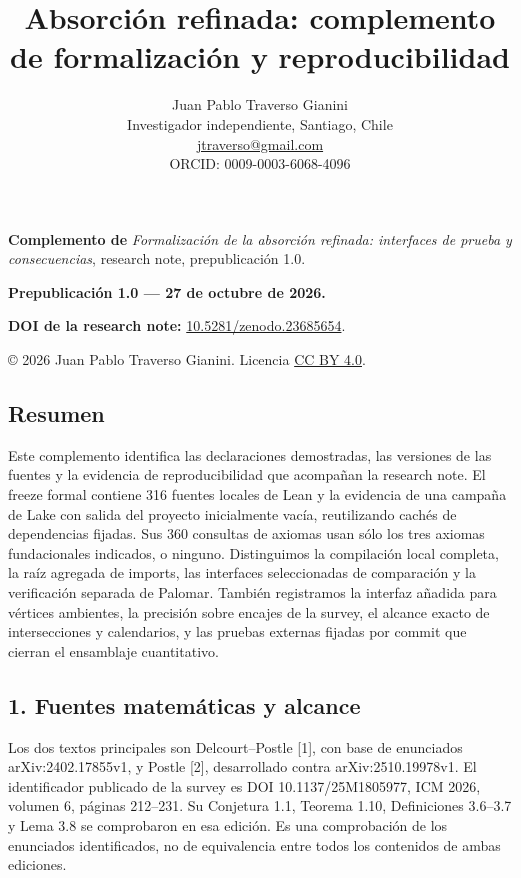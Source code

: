 \documentclass[spanish,11pt,a4paper]{article}
\title{Absorción refinada: complemento de formalización y reproducibilidad}
\author{Juan Pablo Traverso Gianini\\
\small Investigador independiente, Santiago, Chile\\
\small \href{mailto:jtraverso@gmail.com}{jtraverso@gmail.com}\\
\small ORCID: 0009-0003-6068-4096}
\date{}
\begin{document}
\raggedbottom
{}
\makeatletter
{}
\makeatother
\maketitle
\textbf{Complemento de} \emph{Formalización de la absorción refinada: interfaces de prueba y consecuencias}, research note, prepublicación 1.0.

\textbf{Prepublicación 1.0 --- 27 de octubre de 2026.}

\textbf{DOI de la research note:} \href{https://doi.org/10.5281/zenodo.23685654}{10.5281/zenodo.23685654}.

© 2026 Juan Pablo Traverso Gianini. Licencia \href{https://creativecommons.org/licenses/by/4.0/}{CC BY 4.0}.

\subsection{Resumen}\label{resumen}

Este complemento identifica las declaraciones demostradas, las versiones de las fuentes y la evidencia de reproducibilidad que acompañan la research note. El freeze formal contiene 316 fuentes locales de Lean y la evidencia de una campaña de Lake con salida del proyecto inicialmente vacía, reutilizando cachés de dependencias fijadas. Sus 360 consultas de axiomas usan sólo los tres axiomas fundacionales indicados, o ninguno. Distinguimos la compilación local completa, la raíz agregada de imports, las interfaces seleccionadas de comparación y la verificación separada de Palomar. También registramos la interfaz añadida para vértices ambientes, la precisión sobre encajes de la survey, el alcance exacto de intersecciones y calendarios, y las pruebas externas fijadas por commit que cierran el ensamblaje cuantitativo.

\subsection{1. Fuentes matemáticas y alcance}\label{fuentes-matemuxe1ticas-y-alcance}

Los dos textos principales son Delcourt--Postle {[}1{]}, con base de enunciados arXiv:2402.17855v1, y Postle {[}2{]}, desarrollado contra arXiv:2510.19978v1. El identificador publicado de la survey es DOI 10.1137/25M1805977, ICM 2026, volumen 6, páginas 212--231. Su Conjetura 1.1, Teorema 1.10, Definiciones 3.6--3.7 y Lema 3.8 se comprobaron en esa edición. Es una comprobación de los enunciados identificados, no de equivalencia entre todos los contenidos de ambas ediciones.
\end{document}
